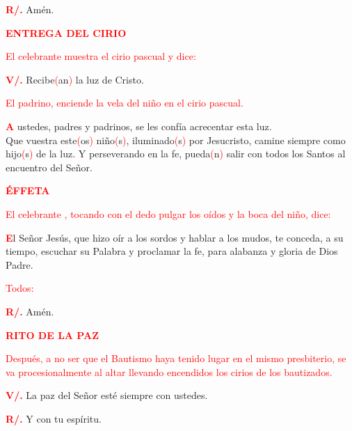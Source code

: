 \documentclass[12pt, letterpaper]{report}
\begin{document}
\Large {\bfseries \textcolor{red}{R/.}} \hspace{0.5cm} Am\'en. 

\Large {\bfseries \textcolor{red}{ENTREGA DEL CIRIO}} 

\large {\textcolor{red}{El celebrante muestra el cirio pascual y dice:}} 

\Large {\bfseries \textcolor{red}{V/.}} \hspace{0.5cm} Recibe\textcolor{red}{(}an\textcolor{red}{)} la luz de Cristo. 

\large {\textcolor{red}{El padrino, enciende la vela del ni\~no en el cirio pascual.}} 

\lettrine[lines=1]{\bfseries \textcolor{red}{A}}{} \Large ustedes, padres y padrinos, se les conf\'ia acrecentar esta luz.\\
Que vuestra este\textcolor{red}{(}os\textcolor{red}{)} ni\~no\textcolor{red}{(}s\textcolor{red}{)}, iluminado\textcolor{red}{(}s\textcolor{red}{)} por Jesucristo, camine siempre como hijo\textcolor{red}{(}s\textcolor{red}{)} de la luz. Y perseverando en la fe, pueda\textcolor{red}{(}n\textcolor{red}{)} salir con todos los Santos al encuentro del Se\~nor. 

\Large {\bfseries \textcolor{red}{ \'EFFETA}} 

\large {\textcolor{red}{El celebrante , tocando con el dedo pulgar los o\'idos y la boca del ni\~no, dice:}} 

\lettrine[lines=1]{\bfseries \textcolor{red}{E}}{}\Large l Se\~nor Jes\'us, que hizo o\'ir a los sordos y hablar a los mudos, te conceda, a su tiempo, escuchar su Palabra y proclamar la fe, para alabanza y gloria de Dios Padre.

\large {\textcolor{red}{Todos:}}

\Large {\bfseries \textcolor{red}{R/.}} \hspace{0.5cm} Am\'en.

\Large {\bfseries \textcolor{red}{RITO DE LA PAZ}}

\large {\textcolor{red}{Despu\'es, a no ser que el Bautismo haya tenido lugar en el mismo presbiterio, se va procesionalmente al altar llevando encendidos los cirios de los bautizados.}}


\Large {\bfseries \textcolor{red}{V/.}} \hspace{0.5cm} La paz del Se\~nor est\'e siempre con ustedes.

\Large {\bfseries \textcolor{red}{R/.}} \hspace{0.5cm} Y con tu esp\'iritu. 
\end{document}
